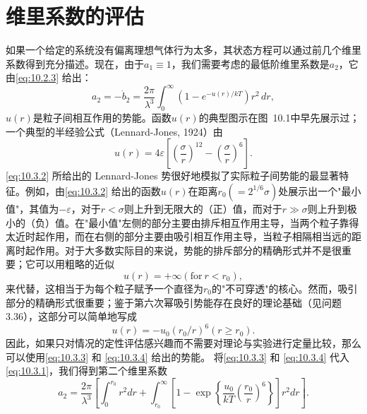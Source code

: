 \section{维里系数的评估}\label{ux7ef4ux91ccux7cfbux6570ux7684ux8bc4ux4f30}
如果一个给定的系统没有偏离理想气体行为太多，其状态方程可以通过前几个维里系数得到充分描述。现在，由于\(a_{1} \equiv 1\)，我们需要考虑的最低阶维里系数是\(a_{2}\)，它由\autoref{eq:10.2.3} 给出：
\begin{equation}\tag{10.3.1}\label{eq:10.3.1}
a _ { 2 } = - \dot { b } _ { 2 } = \frac { 2 \pi } { \lambda ^{3} } \int _ { 0 } ^{\infty} \left( 1 - e ^{- u ( r ) / k T} \right) r ^{2} \, d r ,
\end{equation}
\(u(r)\)是粒子间相互作用的势能。函数\(u(r)\)的典型图示在图~10.1中早先展示过；一个典型的半经验公式（Lennard-Jones, 1924）由
\begin{equation}\tag{10.3.2}\label{eq:10.3.2}
u ( r ) = 4 \varepsilon \left[ \left( \frac { \sigma } { r } \right) ^{12} - \left( \frac { \sigma } { r } \right) ^{6} \right] .
\end{equation}
\autoref{eq:10.3.2} 所给出的 Lennard-Jones 势很好地模拟了实际粒子间势能的最显著特征。例如，由\autoref{eq:10.3.2} 给出的函数\(u(r)\)在距离\(r_0(=2^{1/6}\sigma)\)处展示出一个"最小值"，其值为\(-\varepsilon\)，对于\(r<\sigma\)则上升到无限大的（正）值，而对于\(r\gg\sigma\)则上升到极小的（负）值。在"最小值"左侧的部分主要由排斥相互作用主导，当两个粒子靠得太近时起作用，而在右侧的部分主要由吸引相互作用主导，当粒子相隔相当远的距离时起作用。对于大多数实际目的来说，势能的排斥部分的精确形式并不是很重要；它可以用粗略的近似
\begin{equation}\tag{10.3.3}\label{eq:10.3.3}
u ( r ) = + \infty  ( \mathrm { f o r } \ r < r _ { 0 } ) ,
\end{equation}
来代替，这相当于为每个粒子赋予一个直径为\(r_0\)的"不可穿透"的核心。然而，吸引部分的精确形式很重要；鉴于第六次幂吸引势能存在良好的理论基础（见问题3.36），这部分可以简单地写成
\begin{equation}\tag{10.3.4}\label{eq:10.3.4}
u ( r ) = - u _ { 0 } ( r _ { 0 } / r ) ^{6}  ( r \geq r _ { 0 } ) .
\end{equation}
因此，如果只对情况的定性评估感兴趣而不需要对理论与实验进行定量比较，那么可以使用\autoref{eq:10.3.3} 和 \autoref{eq:10.3.4} 给出的势能。
将\autoref{eq:10.3.3} 和 \autoref{eq:10.3.4} 代入\autoref{eq:10.3.1}，我们得到第二个维里系数
\begin{equation}\tag{10.3.5}\label{eq:10.3.5}
a _ { 2 } = \frac { 2 \pi } { \lambda ^{3} } \left[ \int _ { 0 } ^{r _ { 0} } r ^{2} d r + \int _ { r _ { 0 } } ^{\infty} \left[ 1 - \exp \left\{ \frac { u _ { 0 } } { k T } \left( \frac { r _ { 0 } } { r } \right) ^{6} \right\} \right] r ^{2} d r \right] .
\end{equation}
